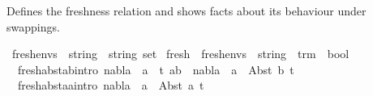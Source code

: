 %
\begin{isabellebody}%
%
%
\isadelimtheory
%
\endisadelimtheory
%
\isatagtheory
%
\endisatagtheory
{\isafoldtheory}%
%
\isadelimtheory
%
\endisadelimtheory
%
\isadelimdocument
%
\endisadelimdocument
%
\isatagdocument
%
\isamarkuptrue%
%
\endisatagdocument
{\isafolddocument}%
%
\isadelimdocument
%
\endisadelimdocument
%
\begin{isamarkuptext}%
Defines the freshness relation and shows facts about its behaviour under swappings.%
\end{isamarkuptext}\isamarkuptrue%
\isamarkupfalse%
\ fresh{\isacharunderscore}{\kern0pt}envs\ {\isacharequal}{\kern0pt}\ {\isachardoublequoteopen}{\isacharparenleft}{\kern0pt}string\ {\isasymtimes}\ string{\isacharparenright}{\kern0pt}\ set{\isachardoublequoteclose}\isanewline
\isanewline
{}\isamarkupfalse%
\ fresh\ {\isacharcolon}{\kern0pt}{\isacharcolon}{\kern0pt}\ {\isachardoublequoteopen}fresh{\isacharunderscore}{\kern0pt}envs\ {\isasymRightarrow}\ string\ {\isasymRightarrow}\ trm\ {\isasymRightarrow}\ bool{\isachardoublequoteclose}\ {\isacharparenleft}{\kern0pt}{\isachardoublequoteopen}\ {\isacharunderscore}{\kern0pt}\ {\isasymturnstile}\ {\isacharunderscore}{\kern0pt}\ {\isasymsharp}\ {\isacharunderscore}{\kern0pt}{\isachardoublequoteclose}\ {\isacharbrackleft}{\kern0pt}{}{}{\isacharcomma}{\kern0pt}{}{}{\isacharcomma}{\kern0pt}{}{}{\isacharbrackright}{\kern0pt}\ {}{}{\isacharparenright}{\kern0pt}\ \isanewline
\ \ \isanewline
\ \ fresh{\isacharunderscore}{\kern0pt}abst{\isacharunderscore}{\kern0pt}ab{\isacharbrackleft}{\kern0pt}intro{\isacharbang}{\kern0pt}{\isacharbrackright}{\kern0pt}{\isacharcolon}{\kern0pt}\ {\isachardoublequoteopen}{\isasymlbrakk}nabla\ {\isasymturnstile}\ a\ {\isasymsharp}\ t{\isacharsemicolon}{\kern0pt}\ a{\isasymnoteq}b{\isasymrbrakk}\ {\isasymLongrightarrow}\ nabla\ {\isasymturnstile}\ a\ {\isasymsharp}\ Abst\ b\ t{\isachardoublequoteclose}\ {\isacharbar}{\kern0pt}\isanewline
\ \ fresh{\isacharunderscore}{\kern0pt}abst{\isacharunderscore}{\kern0pt}aa{\isacharbrackleft}{\kern0pt}intro{\isacharbang}{\kern0pt}{\isacharbrackright}{\kern0pt}{\isacharcolon}{\kern0pt}\ {\isachardoublequoteopen}nabla\ {\isasymturnstile}\ a\ {\isasymsharp}\ Abst\ a\ t{\isachardoublequoteclose}\ {\isacharbar}{\kern0pt}\isanewline

\end{isabellebody}
